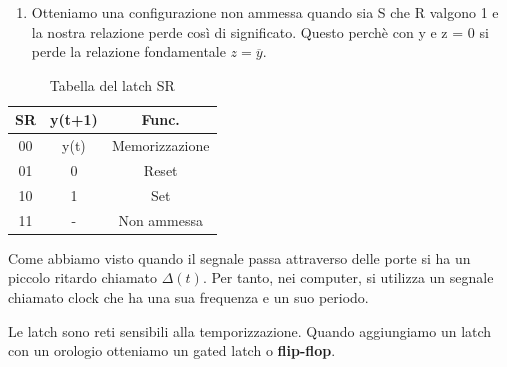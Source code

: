 \begin{enumerate}
\begin{enumerate}
        Per y = 0 e z = 1 abbiamo che $y=\overline{R+z}=\overline{1+1}=0$ e $z=\overline{S+y}=\overline{0+0}=1$.
        
        In entrambe i casi la y è stata impostata a valore 0.
    \end{enumerate}
    
    \item Otteniamo una configurazione non ammessa quando sia S che R valgono 1 e la nostra relazione perde così di significato. 
    Questo perchè con y e z = 0 si perde la relazione fondamentale $z=\overline{y}$.
\end{enumerate}

\begin{table}[ht]
    \centering
    \begin{tabular}{|c|c|c|}
         \hline SR & y(t+1) & Func.\\\hline\hline
         00 & y(t) & Memorizzazione\\\hline
         01 & 0 & Reset\\\hline
         10 & 1 & Set\\\hline
         11 & - & Non ammessa\\\hline
    \end{tabular}
    \caption{Tabella del latch SR}
    \label{tab:latch_SR}
\end{table}

Come abbiamo visto quando il segnale passa attraverso delle porte si ha un piccolo ritardo chiamato $\Delta (t)$. Per tanto, nei computer, si utilizza un segnale chiamato clock che ha una sua frequenza e un suo periodo.

Le latch sono reti sensibili alla temporizzazione. Quando aggiungiamo un latch con un orologio otteniamo un gated latch o \textbf{flip-flop}.

